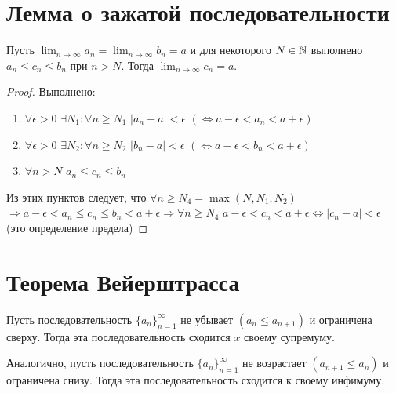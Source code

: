 	\section{Лемма о зажатой последовательности}
	
	\begin{lemma}
		Пусть $\lim_{n \to \infty} a_n = \lim_{n \to \infty} b_n = a$ и для некоторого $N \in \mathbb N$ выполнено $a_n \leqslant c_n \leqslant b_n$ при $n > N$. Тогда $\lim_{n \to \infty} c_n = a$.
	\end{lemma}
	
	\begin{proof}
		Выполнено:
		\begin{enumerate}
			\item $\forall \epsilon > 0$ $\exists N_1: \forall n \geqslant N_1$ $|a_n - a| < \epsilon$ $(\Leftrightarrow a - \epsilon < a_n < a + \epsilon)$
			\item $\forall \epsilon > 0$ $\exists N_2: \forall n \geqslant N_2$ $|b_n - a| < \epsilon$ $(\Leftrightarrow a - \epsilon < b_n < a + \epsilon)$
			\item $\forall n > N$ $a_n \leqslant c_n \leqslant b_n$
		\end{enumerate}
		Из этих пунктов следует, что $\forall n \geqslant N_4 = \max{(N, N_1, N_2)}$ $\Rightarrow a - \epsilon < a_n \leqslant c_n \leqslant b_n < a + \epsilon \Rightarrow \forall n \geqslant N_4$ $a - \epsilon < c_n < a + \epsilon \Leftrightarrow |c_n - a| < \epsilon$ (это определение предела)
	\end{proof}
	
	\section{Теорема Вейерштрасса}
	
	\begin{theorem}[Вейерштрасс]
		Пусть последовательность $\{a_n\}^{\infty}_{n = 1}$ не убывает $(a_n \leqslant a_{n + 1})$ и ограничена сверху. Тогда эта последовательность сходится $x$ своему супремуму.
		
		Аналогично, пусть последовательность $\{a_n\}^{\infty}_{n = 1}$ не возрастает $(a_{n + 1} \leqslant a_n)$ и ограничена снизу. Тогда эта последовательность сходится к своему инфимуму.
	\end{theorem}
	
